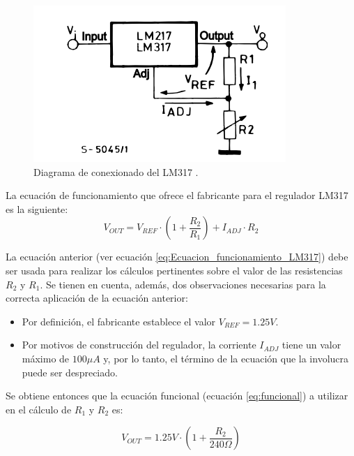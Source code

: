\begin{figure}[H]
    \centering 
    \includegraphics[width=.6\linewidth]{pictures/LM317 conexionado.PNG}
    \caption{Diagrama de conexionado del LM317 \cite{noauthor_lm317_nodate}.}
    \label{fig:LM317_Conexionado}
\end{figure}

La ecuación de funcionamiento que ofrece el fabricante para el regulador LM317 es la siguiente:
\begin{equation}
    V_{OUT} = V_{REF} \cdot \left( 1 + \frac{R_2}{R_1}\right) + I_{ADJ} \cdot R_2
    \label{eq:Ecuacion_funcionamiento_LM317}
\end{equation}

La ecuación anterior (ver ecuación \ref{eq:Ecuacion_funcionamiento_LM317}) debe ser usada para realizar los cálculos pertinentes sobre el valor de las resistencias $R_2$ y $R_1$. Se tienen en cuenta, además, dos observaciones necesarias para la correcta aplicación de la ecuación anterior:
\begin{itemize}
    \item Por definición, el fabricante establece el valor $V_{REF} = 1.25V$.
    \item Por motivos de construcción del regulador, la corriente $I_{ADJ}$ tiene un valor máximo de $100 \mu A$ y, por lo tanto, el término de la ecuación que la involucra puede ser despreciado.
\end{itemize}

Se obtiene entonces que la ecuación funcional (ecuación \ref{eq:funcional}) a utilizar en el cálculo de $R_1$ y $R_2$ es:

\begin{equation}
    V_{OUT} = 1.25V \cdot \left( 1 + \frac{R_2}{240\Omega}\right) 
    \label{eq:funcional}
\end{equation}

